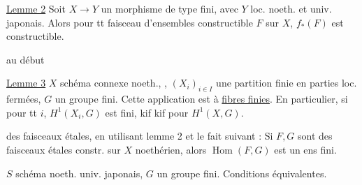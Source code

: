 \uline{Lemme 2} Soit $X\to Y$ un morphisme de type fini, avec $Y$ loc. noeth. et univ. japonais.
Alors pour tt faisceau d'ensembles constructible $F$ sur $X$, $f_*(F)$ est constructible.

 au début

\uline{Lemme 3} $X$ schéma connexe  noeth.,
,
$(X_i)_{i\in I}$ une partition finie en parties loc. fermées, $G$ un groupe fini.
Cette application est à \uline{fibres finies}. En particulier, si pour tt $i$, $H^1(X_i,G)$ est fini, kif kif pour $H^1(X,G)$.

 des faisceaux étales, en utilisant lemme 2 et le fait suivant :
Si $F,G$ sont des faisceaux  étales constr. sur $X$ noethérien, alors $\operatorname{Hom}(F,G)$ est un ens fini.

$S$  schéma noeth. univ. japonais,
$G$ un groupe fini. Conditions équivalentes.
